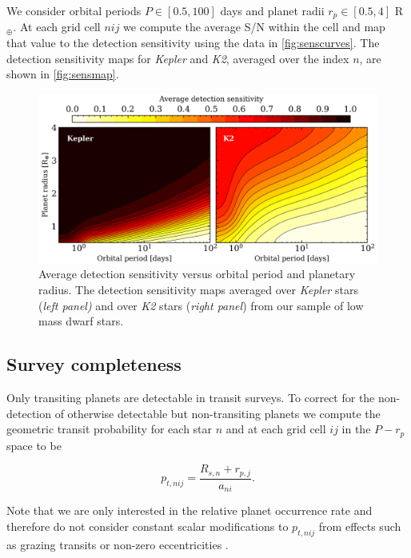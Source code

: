 \documentclass[twocolumn]{emulateapj}
\newcommand{\kepler}[1]{\emph{Kepler}#1}
\newcommand{\ktwo}[1]{\emph{K2}#1}
\begin{document}
We consider orbital periods $P \in [0.5,100]$ days and planet radii $r_p \in [0.5,4]$ R$_{\oplus}$. At
each grid cell $nij$ we compute the average S/N within the cell and map that value to the detection sensitivity
using the data in \autoref{fig:senscurves}. The detection sensitivity maps for \kepler{} and \ktwo{,}
averaged over the index $n$, are shown in \autoref{fig:sensmap}.

 

\begin{figure}
  \centering
  \includegraphics[width=0.98\hsize]{figures/sensmap.png}
  \caption{Average detection sensitivity versus orbital period and planetary radius.
    The detection sensitivity maps averaged over \kepler{} stars (\emph{left panel)} and over \ktwo{} stars
    (\emph{right panel}) from our sample of low mass dwarf stars.} 
  \label{fig:sensmap}
\end{figure}


\subsection{Survey completeness} \label{sect:comp}
Only transiting planets are detectable in transit surveys. To correct for the non-detection of otherwise
detectable but non-transiting planets we compute
the geometric transit probability for each star $n$ and at each grid cell $ij$ in the $P-r_p$ space to be

\begin{equation}
  p_{t,nij} = \frac{R_{s,n} + r_{p,j}}{a_{ni}}. \label{eq:ptransit}
\end{equation}

\noindent Note that we are only interested in the relative planet occurrence rate and therefore do not consider
constant scalar modifications to $p_{t,nij}$ from effects such as grazing transits or non-zero eccentricities 
\citep{barnes07b}.
\end{document}
